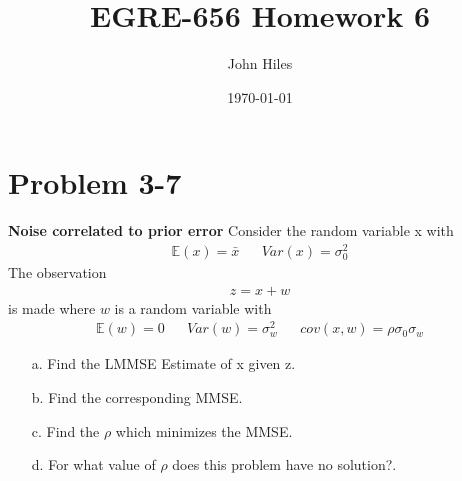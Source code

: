 \documentclass{article}
\title{EGRE-656 Homework 6}
\author{John Hiles}
\date\today
\begin{document}
\maketitle %

\section*{Problem 3-7}
\textbf{Noise correlated to prior error}
Consider the random variable x with 
\begin{align*}
\mathbb{E}(x) = \bar{x} && Var(x) = \sigma^2_0
\end{align*}
The observation
\begin{align*}
z=x+w
\end{align*}
is made where $w$ is a random variable with 
\begin{align*}
\mathbb{E}(w) = 0 && Var(w) = \sigma^2_w && cov(x,w) = \rho\sigma_0\sigma_w
\end{align*}
\begin{enumerate}
\item[a.] Find the LMMSE Estimate of x given z.
\item[b.] Find the corresponding MMSE.
\item[c.] Find the $\rho$ which minimizes the MMSE.
\item[d.] For what value of $\rho$ does this problem have no solution?.
\end{enumerate}
\end{document}
